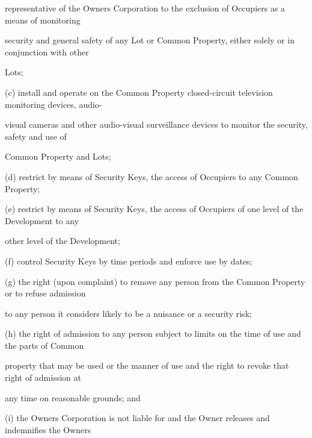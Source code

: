 \documentclass{article}
\begin{document}
{\fontsize{10.02}{1}representative of the Owners Corporation to the exclusion of Occupiers as a means of monitoring }

{\fontsize{10.02}{1}security and general safety of any Lot or Common Property, either solely or in conjunction with other }

{\fontsize{10.02}{1}Lots; }

{\fontsize{9.962}{1}(c) install and operate on the Common Property closed-circuit television monitoring devices, audio- }

{\fontsize{10.02}{1}visual cameras and other audio-visual surveillance devices to monitor the security, safety and use of }

{\fontsize{10.02}{1}Common Property and Lots; }

{\fontsize{9.962}{1}(d) restrict by means of Security Keys, the access of Occupiers to any Common Property; }

{\fontsize{9.962}{1}(e) restrict by means of Security Keys, the access of Occupiers of one level of the Development to any }

{\fontsize{10.02}{1}other level of the Development; }

\newpage



















{\fontsize{9.962}{1}(f) control Security Keys by time periods and enforce use by dates; }

{\fontsize{9.962}{1}(g) the right (upon complaint) to remove any person from the Common Property or to refuse admission }

{\fontsize{10.02}{1}to any person it considers likely to be a nuisance or a security risk; }

{\fontsize{9.962}{1}(h) the right of admission to any person subject to limits on the time of use and the parts of Common }

{\fontsize{10.02}{1}property that may be used or the manner of use and the right to revoke that right of admission at }

{\fontsize{10.02}{1}any time on reasonable grounds; and }

{\fontsize{9.962}{1}(i) the Owners Corporation is not liable for and the Owner releases and indemnifies the Owners }
\end{document}

